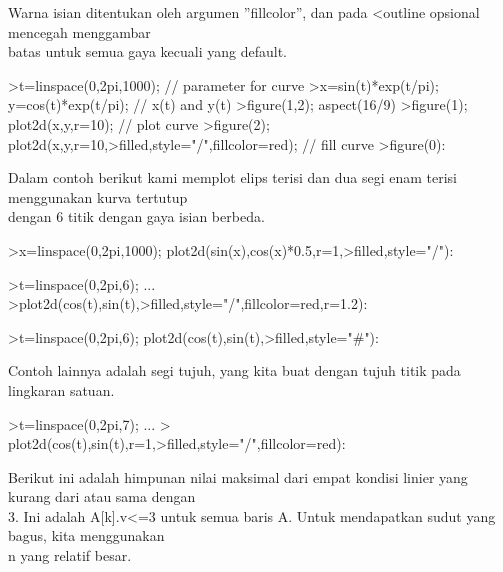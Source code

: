 \documentclass[a4paper,10pt]{article}
\begin{document}
\begin{eulernotebook}
\begin{eulercomment}
\begin{eulercomment}
\begin{eulercomment}
\begin{eulercomment}
\begin{eulercomment}
\begin{eulercomment}
\begin{eulercomment}
Warna isian ditentukan oleh argumen ”fillcolor”, dan pada \textless{}outline
opsional mencegah menggambar\\
batas untuk semua gaya kecuali yang default.
\end{eulercomment}
\begin{eulerprompt}
>t=linspace(0,2pi,1000); // parameter for curve
>x=sin(t)*exp(t/pi); y=cos(t)*exp(t/pi); // x(t) and y(t)
>figure(1,2); aspect(16/9)
>figure(1); plot2d(x,y,r=10); // plot curve
>figure(2); plot2d(x,y,r=10,>filled,style="/",fillcolor=red); // fill curve
>figure(0):
\end{eulerprompt}
\begin{eulercomment}
Dalam contoh berikut kami memplot elips terisi dan dua segi enam
terisi menggunakan kurva tertutup\\
dengan 6 titik dengan gaya isian berbeda.
\end{eulercomment}
\begin{eulerprompt}
>x=linspace(0,2pi,1000); plot2d(sin(x),cos(x)*0.5,r=1,>filled,style="/"):
\end{eulerprompt}
\begin{eulerprompt}
>t=linspace(0,2pi,6); ...
>plot2d(cos(t),sin(t),>filled,style="/",fillcolor=red,r=1.2):
\end{eulerprompt}
\begin{eulerprompt}
>t=linspace(0,2pi,6); plot2d(cos(t),sin(t),>filled,style="#"):
\end{eulerprompt}
\begin{eulercomment}
Contoh lainnya adalah segi tujuh, yang kita buat dengan tujuh titik
pada lingkaran satuan.
\end{eulercomment}
\begin{eulerprompt}
>t=linspace(0,2pi,7);  ...
> plot2d(cos(t),sin(t),r=1,>filled,style="/",fillcolor=red):
\end{eulerprompt}
\begin{eulercomment}
Berikut ini adalah himpunan nilai maksimal dari empat kondisi linier
yang kurang dari atau sama dengan\\
3. Ini adalah A[k].v\textless{}=3 untuk semua baris A. Untuk mendapatkan sudut
yang bagus, kita menggunakan\\
n yang relatif besar.
\end{eulercomment}
\begin{eulerprompt}

\end{eulerprompt}
\end{eulercomment}
\end{eulercomment}
\end{eulercomment}
\end{eulercomment}
\end{eulercomment}
\end{eulercomment}
\end{eulernotebook}
\end{document}
